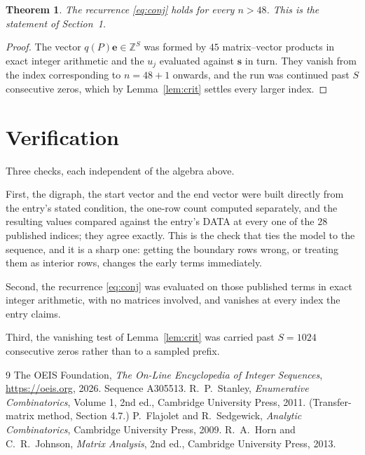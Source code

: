 \documentclass[11pt,a4paper]{article}
\theoremstyle{plain}
\newtheorem{theorem}{Theorem}
\theoremstyle{definition}
\begin{document}
\begin{theorem}
The recurrence \eqref{eq:conj} holds for every $n>48$. This is the statement of
Section~1.
\end{theorem}

\begin{proof}
The vector $q(P)\mathbf{e}\in\mathbb{Z}^{S}$ was formed by $45$ matrix--vector
products in exact integer arithmetic and the $u_j$ evaluated against $\mathbf{s}$ in turn.
They vanish from the index corresponding to $n=48+1$ onwards, and the run was continued
past $S$ consecutive zeros, which by Lemma~\ref{lem:crit} settles every larger index.
\end{proof}

\section{Verification}

Three checks, each independent of the algebra above.

First, the digraph, the start vector and the end vector were built directly from the
entry's stated condition, the one-row count computed separately, and the resulting values
compared against the entry's DATA at every one of the $28$ published indices; they
agree exactly. This is the check that ties the model to the sequence, and it is a sharp one:
getting the boundary rows wrong, or treating them as interior rows, changes the early terms
immediately.

Second, the recurrence \eqref{eq:conj} was evaluated on those published terms in exact
integer arithmetic, with no matrices involved, and vanishes at every index the entry claims.

Third, the vanishing test of Lemma~\ref{lem:crit} was carried past $S=1024$ consecutive
zeros rather than to a sampled prefix.

\begin{thebibliography}{9}
 The OEIS Foundation, \emph{The On-Line Encyclopedia of Integer
Sequences}, \url{https://oeis.org}, 2026. Sequence A305513.
 R.~P.~Stanley, \emph{Enumerative Combinatorics}, Volume 1, 2nd ed.,
Cambridge University Press, 2011. (Transfer-matrix method, Section 4.7.)
 P.~Flajolet and R.~Sedgewick, \emph{Analytic Combinatorics}, Cambridge
University Press, 2009.
 R.~A.~Horn and C.~R.~Johnson, \emph{Matrix Analysis}, 2nd ed., Cambridge
University Press, 2013.
\end{thebibliography}
\end{document}
